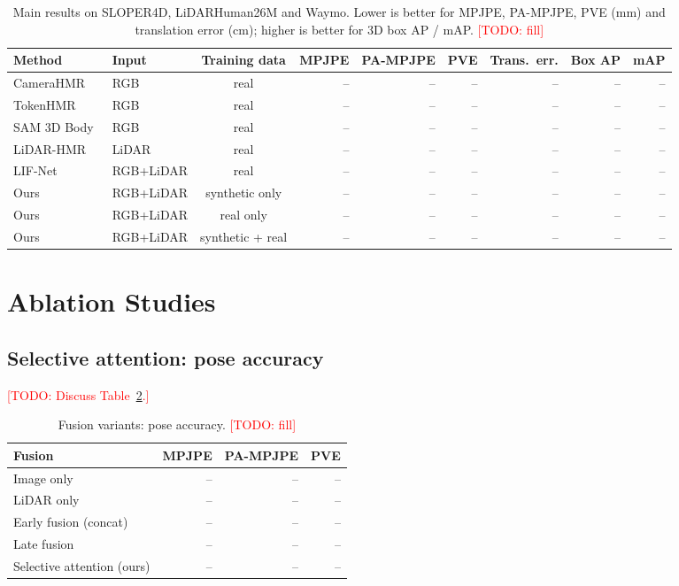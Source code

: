 \documentclass{egpubl}
\newcommand{\todo}[1]{\textcolor{red}{[TODO: #1]}}
\begin{document}
\begin{table}[t]
  \centering
  \caption{Main results on SLOPER4D, LiDARHuman26M and Waymo. Lower is better for MPJPE, PA-MPJPE, PVE (mm) and translation error (cm); higher is better for 3D box AP / mAP. \todo{fill}}
  \label{tab:main}
  \begin{tabular}{@{}llcrrrrrr@{}}
    \toprule
    Method & Input & Training data & MPJPE & PA-MPJPE & PVE & Trans.\ err. & Box AP & mAP \\
    \midrule
    CameraHMR~\cite{patel2025camerahmr} & RGB   & real      & -- & -- & -- & -- & -- & -- \\
    TokenHMR~\cite{dwivedi2024tokenhmr} & RGB   & real      & -- & -- & -- & -- & -- & -- \\
    SAM 3D Body~\cite{sam3dbody2025}    & RGB   & real      & -- & -- & -- & -- & -- & -- \\
    LiDAR-HMR~\cite{fan2025lidarhmr}    & LiDAR & real      & -- & -- & -- & -- & -- & -- \\
    LIF-Net~\cite{buettner_iv2026_lifnet}               & RGB+LiDAR & real  & -- & -- & -- & -- & -- & -- \\
    \midrule
    Ours & RGB+LiDAR & synthetic only      & -- & -- & -- & -- & -- & -- \\
    Ours & RGB+LiDAR & real only           & -- & -- & -- & -- & -- & -- \\
    Ours & RGB+LiDAR & synthetic + real    & -- & -- & -- & -- & -- & -- \\
    \bottomrule
  \end{tabular}
\end{table}

\section{Ablation Studies}
\label{sec:ablation}

\subsection{Selective attention: pose accuracy}
\todo{Discuss Table~\ref{tab:abl_attention_pose}.}

\begin{table}[t]
  \centering
  \caption{Fusion variants: pose accuracy. \todo{fill}}
  \label{tab:abl_attention_pose}
  \begin{tabular}{@{}lrrr@{}}
    \toprule
    Fusion & MPJPE & PA-MPJPE & PVE \\
    \midrule
    Image only            & -- & -- & -- \\
    LiDAR only            & -- & -- & -- \\
    Early fusion (concat) & -- & -- & -- \\
    Late fusion           & -- & -- & -- \\
    Selective attention (ours) & -- & -- & -- \\
    \bottomrule
  \end{tabular}
\end{table}
\end{document}
